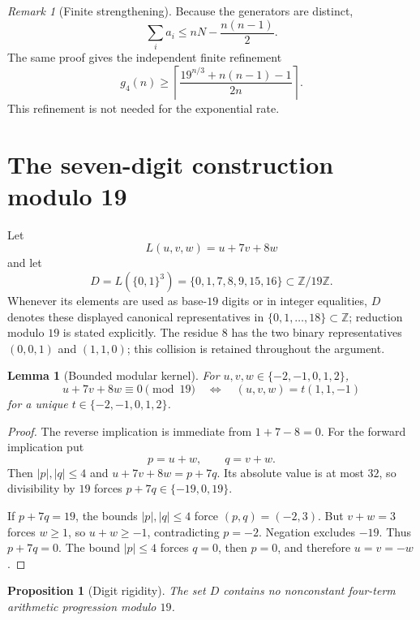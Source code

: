 \documentclass[11pt]{article}
\newtheorem{lemma}[theorem]{Lemma}
\newtheorem{proposition}[theorem]{Proposition}
\theoremstyle{remark}
\newtheorem{remark}[theorem]{Remark}
\newcommand{\Z}{\mathbb Z}
\begin{document}
\begin{remark}[Finite strengthening]\label{rem:finite-lower}
Because the generators are distinct,
\[
  \sum_i a_i\le nN-\frac{n(n-1)}2.
\]
The same proof gives the independent finite refinement
\[
  g_4(n)\ge
  \left\lceil\frac{19^{n/3}+n(n-1)-1}{2n}\right\rceil.
\]
This refinement is not needed for the exponential rate.
\end{remark}

\section{The seven-digit construction modulo 19}

Let
\[
  L(u,v,w)=u+7v+8w
\]
and let
\[
  D=L(\{0,1\}^3)=\{0,1,7,8,9,15,16\}\subset\Z/19\Z.
\]
Whenever its elements are used as base-$19$ digits or in integer equalities,
$D$ denotes these displayed canonical representatives in
$\{0,1,\ldots,18\}\subset\Z$; reduction modulo $19$ is stated explicitly.
The residue $8$ has the two binary representatives $(0,0,1)$ and $(1,1,0)$;
this collision is retained throughout the argument.

\begin{lemma}[Bounded modular kernel]\label{lem:mod-kernel}
For $u,v,w\in\{-2,-1,0,1,2\}$,
\[
  u+7v+8w\equiv0\pmod{19}
  \quad\Longleftrightarrow\quad
  (u,v,w)=t(1,1,-1)
\]
for a unique $t\in\{-2,-1,0,1,2\}$.
\end{lemma}

\begin{proof}
The reverse implication is immediate from $1+7-8=0$.  For the forward
implication put
\[
  p=u+w,\qquad q=v+w.
\]
Then $|p|,|q|\le4$ and $u+7v+8w=p+7q$.  Its absolute value is at most $32$,
so divisibility by $19$ forces $p+7q\in\{-19,0,19\}$.

If $p+7q=19$, the bounds $|p|,|q|\le4$ force $(p,q)=(-2,3)$.  But
$v+w=3$ forces $w\ge1$, so $u+w\ge-1$, contradicting $p=-2$.  Negation
excludes $-19$.  Thus $p+7q=0$.  The bound $|p|\le4$ forces $q=0$, then
$p=0$, and therefore $u=v=-w$.
\end{proof}

\begin{proposition}[Digit rigidity]\label{prop:digit}
The set $D$ contains no nonconstant four-term arithmetic progression modulo
$19$.
\end{proposition}
\end{document}

